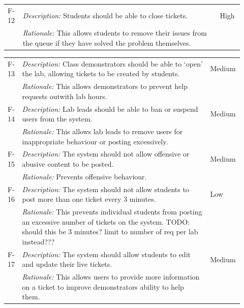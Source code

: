 \documentclass[a4paper,11pt]{article}
\begin{document}
\begin{table}[H]
\begin{tabular}{|p{0.05\linewidth} | p{0.78\linewidth} |p{0.09\linewidth}|}
  
      \hline\hline
 F-12 & \textit{Description:} Students should be able to close tickets. & High\\
  \cline{2-2}
  & \textit{Rationale:} This allows students to remove their issues from the queue if they have solved the problem themselves. & \\
\hline



  \end{tabular}
\end{table}

\begin{table}[H]
\small
\begin{tabular}{|p{0.05\linewidth} | p{0.78\linewidth} |p{0.09\linewidth}|}
  
          \hline
 F-13 & \textit{Description:} Class demonstrators should be able to `open' the lab, allowing tickets to be created by students. & Medium\\
  \cline{2-2}
  & \textit{Rationale:} This allows demonstrators to prevent help requests outwith lab hours. & \\

  
\hline\hline
 F-14 & \textit{Description:} Lab leads should be able to ban or suspend users from the system. & Medium\\
  \cline{2-2}
  & \textit{Rationale:} This allows lab leads to remove users for inappropriate behaviour or posting excessively. & \\
 
 \hline\hline
 F-15 & \textit{Description:} The system should not allow offensive or abusive content to be posted. & Medium\\
  \cline{2-2}
  & \textit{Rationale:} Prevents offensive behaviour. & \\
 
 \hline\hline
 F-16 & \textit{Description:} The system should not allow students to post more than one ticket every 3 minutes. & Low\\
  \cline{2-2}
  & \textit{Rationale:} This prevents individual students from posting an excessive number of tickets on the system. TODO: should this be 3 minutes? limit to number of req per lab instead??? & \\
 
  \hline\hline
 F-17 & \textit{Description:} The system should allow students to edit and update their live tickets. & Medium\\
  \cline{2-2}
  & \textit{Rationale:}  This allows users to provide more information on a ticket to improve demonstrators ability to help them. & \\
 

\end{tabular}
\end{table}
\end{document}

